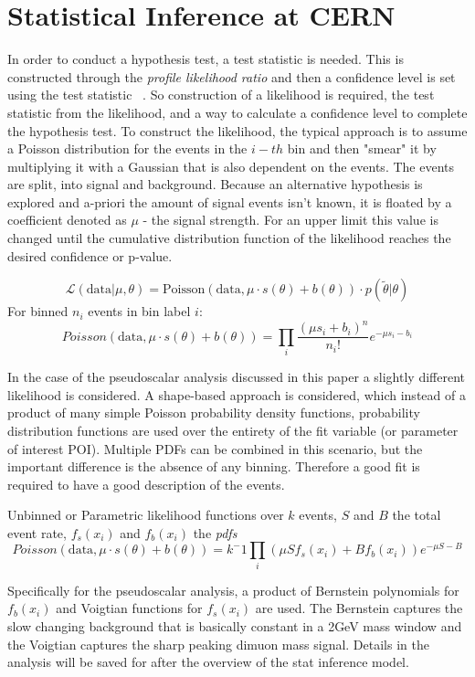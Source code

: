 \section{Statistical Inference at CERN}
In order to conduct a hypothesis test, a test statistic is needed. This is constructed through the \textit{profile likelihood ratio} and then a confidence level is set using the test statistic ~\cite{Cowan_2011}.
So construction of a likelihood is required, the test statistic from the likelihood, and a way to calculate a confidence level to complete the hypothesis test.
To construct the likelihood, the typical approach is to assume a Poisson distribution for the events in the $i-th$ bin and then "smear" it by multiplying it with a Gaussian that is also dependent on the events. The events are split, into signal and background. Because an alternative hypothesis is explored and a-priori the amount of signal events isn't known, it is floated by a coefficient denoted as $\mu$ - the signal strength. For an upper limit this value is changed until the cumulative distribution function of the likelihood reaches the desired confidence or p-value.  

\[\mathcal{L}(\text{data}|\mu,\theta) = \text{Poisson}(\text{data},\mu\cdot s(\theta)+b(\theta)) \cdot p(\tilde{\theta}|\theta) \]
For binned $n_i$ events in bin label $i$:
\begin{equation}Poisson(\text{data},\mu\cdot s(\theta)+b(\theta)) = \prod_i \frac{(\mu s_i+b_i)^n}{n_i !}e^{-\mu s_i -b_i}
\end{equation}

In the case of the pseudoscalar analysis discussed in this paper a slightly different likelihood is considered. A shape-based approach is considered, which instead of a product of many simple Poisson probability density functions, probability distribution functions are used over the entirety of the fit variable (or parameter of interest POI). Multiple PDFs can be combined in this scenario, but the important difference is the absence of any binning. Therefore a good fit is required to have a good description of the events.  

Unbinned or Parametric likelihood functions over $k$ events, $S$ and $B$ the total event rate, $f_s(x_i)$ and $f_b(x_i)$ the \textit{pdfs}
 \[Poisson(\text{data},\mu\cdot s(\theta)+b(\theta)) = k^-1 \prod_i(\mu S f_s(x_i) + B f_b(x_i))e^{-\mu S - B}\]

Specifically for the pseudoscalar analysis, a product of Bernstein polynomials for $f_b(x_i)$ and Voigtian functions for $f_s(x_i)$ are used. The Bernstein captures the slow changing background that is basically constant in a 2GeV mass window and the Voigtian captures the sharp peaking dimuon mass signal. Details in the analysis will be saved for after the overview of the stat inference model. 

